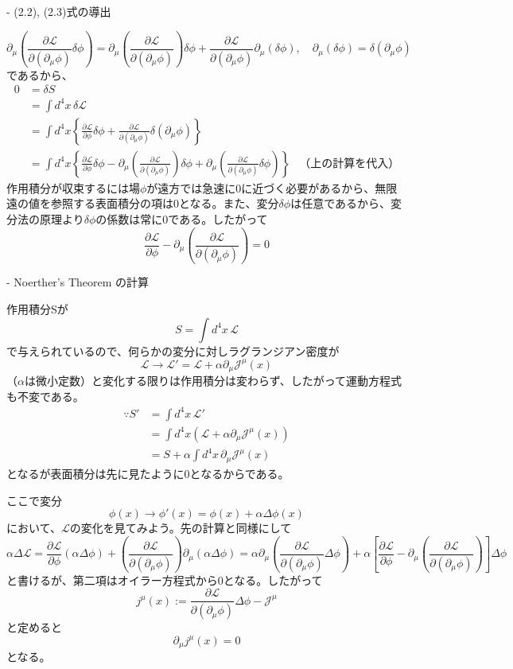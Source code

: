 - (2.2), (2.3)式の導出

\[
  \partial_\mu \left(\frac{\partial \mathcal{L}}{\partial(\partial_\mu \phi)} \delta \phi\right) = \partial_\mu \left(\frac{\partial \mathcal{L}}{\partial(\partial_\mu \phi)}\right) \delta \phi + \frac{\partial \mathcal{L}}{\partial(\partial_\mu \phi)} \partial_\mu (\delta \phi), \quad \partial_\mu (\delta \phi) = \delta(\partial_\mu \phi)
\]
であるから、
\begin{align*}
  0 & = \delta S \\
    & = \int d^4 x \, \delta \mathcal{L} \\
    & = \int d^4 x \left\{ \frac{\partial \mathcal{L}}{\partial \phi}\delta \phi + \frac{\partial \mathcal{L}}{\partial(\partial_\mu \phi)}\delta(\partial_\mu \phi) \right\} \\
    & = \int d^4 x \left\{ \frac{\partial \mathcal{L}}{\partial \phi}\delta \phi - \partial_\mu \left(\frac{\partial \mathcal{L}}{\partial(\partial_\mu \phi)}\right) \delta \phi + \partial_\mu \left(\frac{\partial \mathcal{L}}{\partial(\partial_\mu \phi)} \delta \phi\right) \right\} & \text{（上の計算を代入）}
\end{align*}
作用積分が収束するには場$\phi$が遠方では急速に0に近づく必要があるから、無限遠の値を参照する表面積分の項は0となる。また、変分$\delta \phi$は任意であるから、変分法の原理より$\delta \phi$の係数は常に0である。したがって
\[
  \frac{\partial \mathcal{L}}{\partial \phi} - \partial_\mu \left(\frac{\partial \mathcal{L}}{\partial(\partial_\mu \phi)}\right) = 0
\]

- Noerther's Theorem の計算

作用積分Sが
\[
  S = \int d^4 x \, \mathcal{L}
\]
で与えられているので、何らかの変分に対しラグランジアン密度が
\[
  \mathcal{L} \to \mathcal{L}' = \mathcal{L} + \alpha \partial_\mu \mathcal{J}^\mu (x)
\]
（$\alpha$は微小定数）と変化する限りは作用積分は変わらず、したがって運動方程式も不変である。
\begin{align*}
  \because S' & = \int d^4 x \, \mathcal{L}' \\
              & = \int d^4 x (\mathcal{L} + \alpha \partial_\mu \mathcal{J}^\mu (x)) \\
              & = S + \alpha \int d^4 x \, \partial_\mu \mathcal{J}^\mu (x)
\end{align*}
となるが表面積分は先に見たように0となるからである。

ここで変分
\[
  \phi(x) \to \phi'(x) = \phi(x) + \alpha \Delta \phi(x)
\]
において、$\mathcal{L}$の変化を見てみよう。先の計算と同様にして
\[
  \alpha \Delta \mathcal{L} = \frac{\partial \mathcal{L}}{\partial \phi} (\alpha \Delta \phi) + \left(\frac{\partial \mathcal{L}}{\partial(\partial_\mu \phi)}\right)\partial_\mu (\alpha \Delta \phi)
  = \alpha \partial_\mu \left(\frac{\partial \mathcal{L}}{\partial(\partial_\mu \phi)} \Delta \phi\right) + \alpha \left[\frac{\partial \mathcal{L}}{\partial \phi} - \partial_\mu \left(\frac{\partial \mathcal{L}}{\partial(\partial_\mu \phi)}\right)\right] \Delta \phi
\]
と書けるが、第二項はオイラー方程式から0となる。したがって
\[
  j^\mu (x) := \frac{\partial \mathcal{L}}{\partial(\partial_\mu \phi)} \Delta \phi - \mathcal{J}^\mu
\]
と定めると
\[
  \partial_\mu j^\mu (x) = 0
\]
となる。

